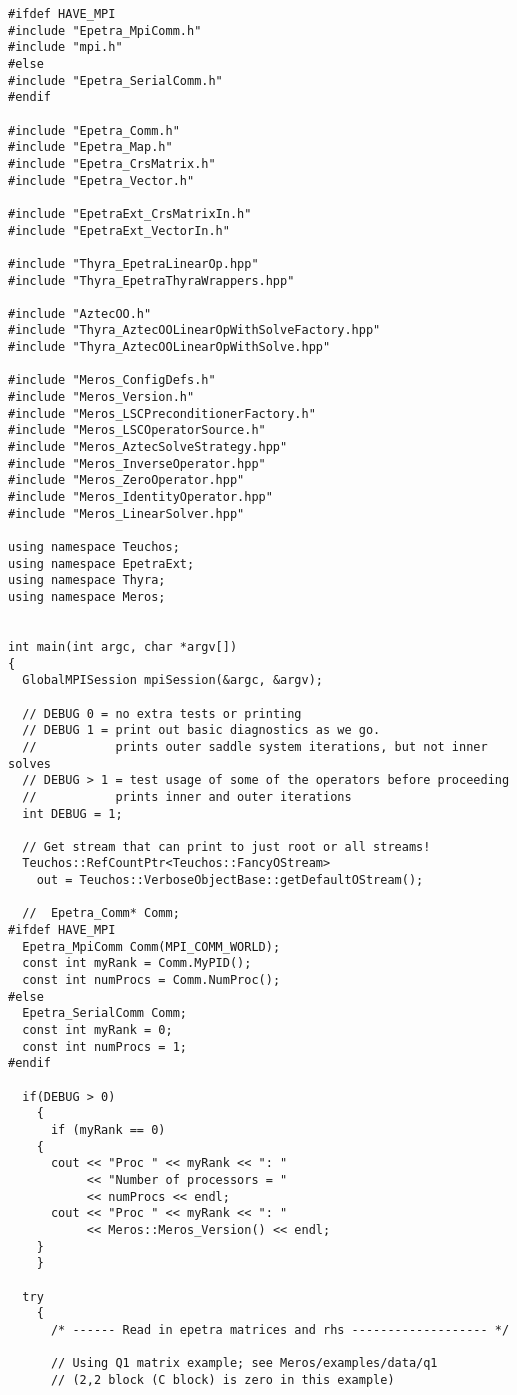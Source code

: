 \documentclass[oneeqnum,onefignum,onetabnum,10pt]{SANDreport}
\begin{document}
\begin{verbatim}
#ifdef HAVE_MPI
#include "Epetra_MpiComm.h"
#include "mpi.h"
#else
#include "Epetra_SerialComm.h"
#endif

#include "Epetra_Comm.h"
#include "Epetra_Map.h"
#include "Epetra_CrsMatrix.h"
#include "Epetra_Vector.h"

#include "EpetraExt_CrsMatrixIn.h"
#include "EpetraExt_VectorIn.h"

#include "Thyra_EpetraLinearOp.hpp"
#include "Thyra_EpetraThyraWrappers.hpp"

#include "AztecOO.h"
#include "Thyra_AztecOOLinearOpWithSolveFactory.hpp"
#include "Thyra_AztecOOLinearOpWithSolve.hpp"

#include "Meros_ConfigDefs.h"
#include "Meros_Version.h"
#include "Meros_LSCPreconditionerFactory.h"
#include "Meros_LSCOperatorSource.h"
#include "Meros_AztecSolveStrategy.hpp"
#include "Meros_InverseOperator.hpp"
#include "Meros_ZeroOperator.hpp"
#include "Meros_IdentityOperator.hpp"
#include "Meros_LinearSolver.hpp"

using namespace Teuchos;
using namespace EpetraExt;
using namespace Thyra;
using namespace Meros;


int main(int argc, char *argv[]) 
{
  GlobalMPISession mpiSession(&argc, &argv);

  // DEBUG 0 = no extra tests or printing
  // DEBUG 1 = print out basic diagnostics as we go.
  //           prints outer saddle system iterations, but not inner solves
  // DEBUG > 1 = test usage of some of the operators before proceeding
  //           prints inner and outer iterations
  int DEBUG = 1;

  // Get stream that can print to just root or all streams!
  Teuchos::RefCountPtr<Teuchos::FancyOStream>
    out = Teuchos::VerboseObjectBase::getDefaultOStream();

  //  Epetra_Comm* Comm;
#ifdef HAVE_MPI
  Epetra_MpiComm Comm(MPI_COMM_WORLD);
  const int myRank = Comm.MyPID();
  const int numProcs = Comm.NumProc();
#else
  Epetra_SerialComm Comm;
  const int myRank = 0;
  const int numProcs = 1;
#endif

  if(DEBUG > 0)
    {
      if (myRank == 0)
	{
	  cout << "Proc " << myRank << ": " 
	       << "Number of processors = " 
	       << numProcs << endl;
	  cout << "Proc " << myRank << ": " 
	       << Meros::Meros_Version() << endl;
	}
    }
  
  try
    {
      /* ------ Read in epetra matrices and rhs ------------------- */

      // Using Q1 matrix example; see Meros/examples/data/q1
      // (2,2 block (C block) is zero in this example)
  

\end{verbatim}
\end{document}
